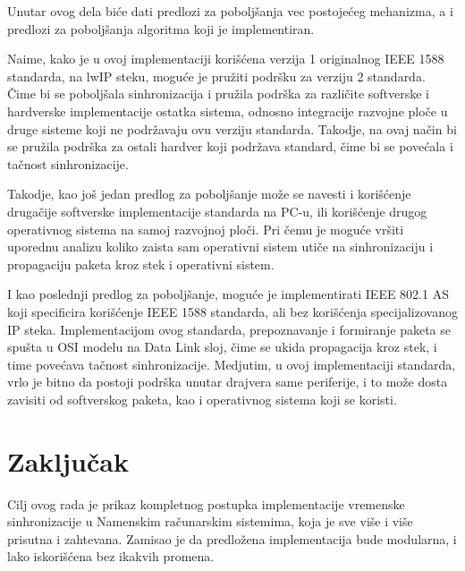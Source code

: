 \documentclass[a4paper,12pt, master]{etf}
\begin{document}
	Unutar ovog dela bi\'{c}e dati predlozi za pobolj\v{s}anja vec
	postoje\'{c}eg mehanizma, a i predlozi za pobolj\v{s}anja algoritma koji je
	implementiran.

	Naime, kako je u ovoj implementaciji kori\v{s}\'{c}ena verzija 1
	originalnog IEEE 1588 standarda, na lwIP steku, mogu\'{c}e je pru\v{z}iti
	podr\v{s}ku za verziju 2 standarda. \v{C}ime bi se pobolj\v{s}ala
	sinhronizacija i pru\v{z}ila podr\v{s}ka za razli\v{c}ite softverske i
	hardverske implementacije ostatka sistema, odnosno integracije razvojne
	plo\v{c}e u druge sisteme koji ne podr\v{z}avaju ovu verziju standarda.
	Takodje, na ovaj na\v{c}in bi se pru\v{z}ila podr\v{s}ka za ostali hardver
	koji podr\v{z}ava standard, \v{c}ime bi se pove\'{c}ala i ta\v{c}nost
	sinhronizacije.

	Takodje, kao jo\v{s} jedan predlog za pobolj\v{s}anje mo\v{z}e se navesti i
	kori\v{s}\'{c}enje druga\v{c}ije softverske implementacije standarda na
	PC-u, ili kori\v{s}\'{c}enje drugog operativnog sistema na samoj razvojnoj
	plo\v{c}i. Pri \v{c}emu je mogu\'{c}e vr\v{s}iti uporednu analizu koliko
	zaista sam operativni sistem uti\v{c}e na sinhronizaciju i propagaciju
	paketa kroz stek i operativni sistem.

	I kao poslednji predlog za pobolj\v{s}anje, mogu\'{c}e je implementirati
	IEEE 802.1 AS koji specificira kori\v{s}\'{c}enje IEEE 1588 standarda, ali
	bez kori\v{s}\'{c}enja specijalizovanog IP steka. Implementacijom ovog
	standarda, prepoznavanje i formiranje paketa se spu\v{s}ta u OSI modelu na
	Data Link sloj, \v{c}ime se ukida propagacija kroz stek, i time pove\'{c}ava
    ta\v{c}nost sinhronizacije. Medjutim, u ovoj implementaciji standarda, vrlo
    je bitno da postoji podr\v{s}ka unutar drajvera same periferije, i to
    mo\v{z}e dosta zavisiti od softverskog paketa, kao i operativnog sistema
    koji se koristi.

	\newpage

    \chapter*{Zaklju\v{c}ak}

	Cilj ovog rada je prikaz kompletnog postupka implementacije vremenske
	sinhronizacije u Namenskim ra\v{c}unarskim sistemima, koja je sve vi\v{s}e
	i vi\v{s}e prisutna i zahtevana. Zamisao je da predlo\v{z}ena
	implementacija bude modularna, i lako iskori\v{s}\'{c}ena bez ikakvih
	promena.
\end{document}
